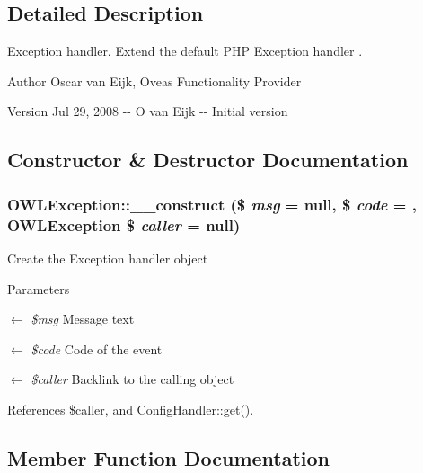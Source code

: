 \subsection{Detailed Description}
Exception handler. Extend the default PHP Exception handler . \begin{DoxyAuthor}{Author}
Oscar van Eijk, Oveas Functionality Provider 
\end{DoxyAuthor}
\begin{DoxyVersion}{Version}
Jul 29, 2008 -\/-\/ O van Eijk -\/-\/ Initial version 
\end{DoxyVersion}


\subsection{Constructor \& Destructor Documentation}
\subsubsection[{\_\-\_\-construct}]{\setlength{\rightskip}{0pt plus 5cm}OWLException::\_\-\_\-construct (\$ {\em msg} = {\ttfamily null}, \/  \$ {\em code} = {}, \/  {\bf OWLException} \$ {\em caller} = {\ttfamily null})}\label{classOWLException_a02821b324b42b7818c3fefe7638444e7}
Create the Exception handler object


\begin{DoxyParams}{Parameters}
\item[\mbox{$\leftarrow$} {\em \$msg}]Message text \item[\mbox{$\leftarrow$} {\em \$code}]Code of the event \item[\mbox{$\leftarrow$} {\em \$caller}]Backlink to the calling object \end{DoxyParams}


References \$caller, and ConfigHandler::get().



\subsection{Member Function Documentation}
